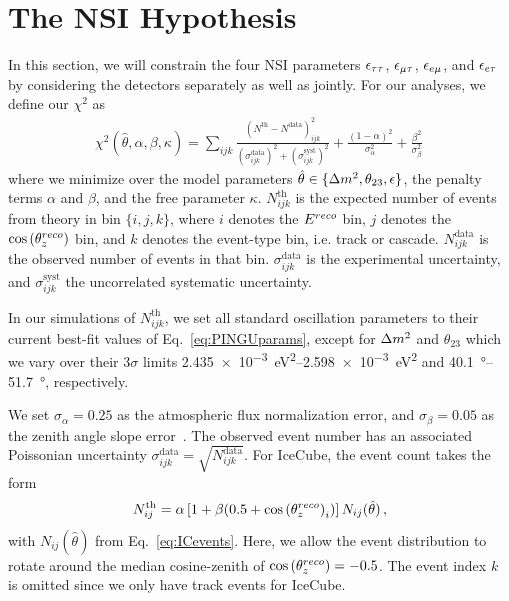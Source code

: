 \section{The NSI Hypothesis}\label{sec:constraining}
In this section, we will constrain the four NSI parameters $\epsilon_{\tau\tau}$, $\epsilon_{\mu\tau}$, $\epsilon_{e\mu}$, and $\epsilon_{e\tau}$ by considering the detectors separately as well as jointly.
For our analyses, we define our $\chi^2$ as
\begin{align}\label{eq:chisq_NSI}
    \chi^{2}(\hat{\theta},\alpha,\beta, \kappa)=\sum_{ijk} \frac{\left(N^\text{th}-N^\text{data}\right)_{ijk}^{2}}
    {\left(\sigma^\text{data}_{ijk}\right)^{2} + \left(\sigma^\text{syst}_{ijk}\right)^{2}}+ 
    \frac{(1-\alpha)^2}{\sigma_\alpha^2} + \frac{\beta^2}{\sigma_\beta^2}\,
\end{align}
where we minimize over the model parameters $\hat{\theta} \in \{\dm, \theta_{23}, \epsilon\}$, the penalty terms $\alpha$ and $\beta$, and the free parameter $\kappa$.
$N_{ijk}^\text{th}$ is the expected number of events from theory in bin $\{i,j,k\}$, where $i$ denotes the $E^{reco}$ bin, $j$ denotes the $\cos{(\theta_z^{reco})}$ bin,
and $k$ denotes the event-type bin, i.e. track or cascade. 
$N_{ijk}^\text{data}$ is the observed number of events in that bin. $\sigma^\text{data}_{ijk}$ is the experimental uncertainty, and $\sigma^\text{syst}_{ijk}$ the uncorrelated systematic
uncertainty.

In our simulations of $N_{ijk}^\text{th}$, we set all standard oscillation parameters to their current best-fit values of Eq.~\ref{eq:PINGUparams}, 
except for $\dm$ and $\theta_{23}$
which we vary over their $3\sigma$ limits \SIrange{2.435e-3}{2.598e-3}{\eV\squared} and \SIrange{40.1}{51.7}{\degree}, respectively.

We set $\sigma_\alpha = 0.25$ as the atmospheric flux normalization error, and $\sigma_\beta = 0.05$ as the zenith angle slope error~\cite{hondapaper}. 
The observed event number has an associated Poissonian uncertainty $\sigma_{ijk}^\text{data} = \sqrt{N_{ijk}^\text{data}}$.
For IceCube, the event count takes the form
\begin{align}
    N^\text{th}_{ij} = \alpha\left[1+\beta (0.5 + \cos{(\theta_z^{reco})}_i )\right] N_{ij}(\hat{\theta})\,,
\end{align}
with $N_{ij}(\hat{\theta})$ from Eq.~\ref{eq:ICevents}. Here, we allow the event distribution to rotate around the median cosine-zenith of $\cos{(\theta_z^{reco})} = -0.5$. 
The event index $k$ is omitted since we only have track events for IceCube.

